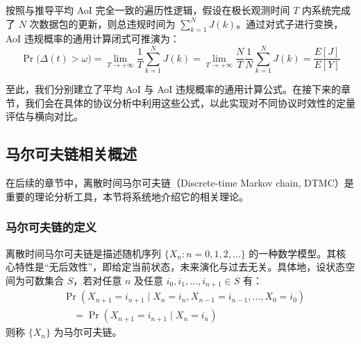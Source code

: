\begin{enumerate}[wide]
    按照与推导平均 AoI 完全一致的遍历性逻辑，假设在极长观测时间 $T$ 内系统完成了 $N$ 次数据包的更新，则总违规时间为 $\sum_{k=1}^{N}J(k)$。通过对式子进行变换，AoI 违规概率的通用计算闭式可推演为：
    \begin{equation}\label{cp2_aoi_violation_expression}
    \Pr\!\big(\Delta(t) > \omega\big) = \lim_{T \to +\infty} \frac{1}{T} \sum_{k=1}^{N} J(k) = \lim_{T \to +\infty} \frac{N}{T} \frac{1}{N} \sum_{k=1}^{N} J(k) = \frac{E[J]}{E[Y]}
    \end{equation}
\end{enumerate}

至此，我们分别建立了平均 AoI 与 AoI 违规概率的通用计算公式。在接下来的章节，我们会在具体的协议分析中利用这些公式，以此实现对不同协议时效性的定量评估与横向对比。

\subsection{马尔可夫链相关概述}
在后续的章节中，离散时间马尔可夫链（Discrete-time Markov chain, DTMC）是重要的理论分析工具，本节将系统地介绍它的相关理论。

\subsubsection{马尔可夫链的定义}
离散时间马尔可夫链是描述随机序列 $\{X_n : n=0, 1, 2, \dots\}$ 的一种数学模型。其核心特性是“无后效性”，即给定当前状态，未来演化与过去无关。具体地，设状态空间为可数集合 $S$，若对任意 $n$ 及任意 $i_0, i_1, \dots, i_{n+1} \in S$ 有：
\begin{equation}
    \begin{split}
        &\Pr(X_{n+1}=i_{n+1} \mid X_n=i_n, X_{n-1}=i_{n-1}, \dots, X_0=i_0) \\
        &\quad = \Pr(X_{n+1}=i_{n+1} \mid X_n=i_n)
    \end{split}
\end{equation}
则称 $\{X_n\}$ 为马尔可夫链。

